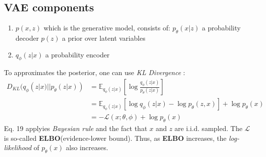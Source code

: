 \documentclass{article}
\begin{document}
\subsection{VAE components}
\begin{enumerate}
    \item $p(x,z)$ which is the generative model, consists of: 
    \subitem * $p_{\theta}(x|z)$ a probability decoder
    \subitem * $p(z)$ a prior over latent variables
    \item $q_{\phi}(z|x)$ a probability encoder
\end{enumerate}
To approximates the posterior, one can use \textit{KL Divergence} :
\begin{align}
    D_{KL}(q_{\phi}(z|x)||p_{\theta}(z|x)) &= \mathbb{E}_{q_{\phi}(z|x)}[\log{\frac{q_{\phi}(z|x)}{p_{\theta}(z|x)}}]\\
    &=\mathbb{E}_{q_{\phi}(z|x)}[\log{q_{\phi}(z|x)} - \log{p_{\theta}(z,x)}]+\log{p_{\theta}(x)}\\
    &= -\mathcal{L}(x;\theta,\phi) + \log{p_{\theta}(x)}
\end{align}
Eq. 19 applyies \textit{Bayesian rule} and the fact that $x$ and $z$ are i.i.d. sampled. The $\mathcal{L}$ is so-called \textbf{ELBO}(evidence-lower bound). Thus, as \textbf{ELBO} increases, the \textit{log-likelihood} of $p_{\theta}(x)$ also increases.
\end{document}
